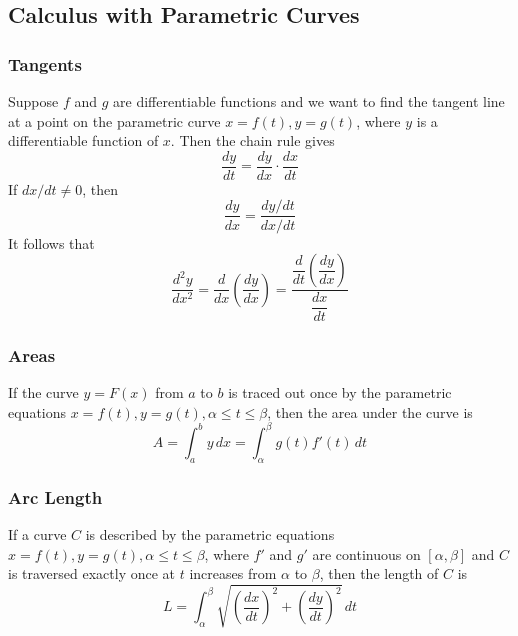 \subsection{Calculus with Parametric Curves}

\subsubsection*{Tangents}
Suppose \(f\) and \(g\) are differentiable functions and we want to find the
tangent line at a point on the parametric curve \(x=f(t),y=g(t)\), where \(y\)
is a differentiable function of \(x\).
Then the chain rule gives
\[\frac{dy}{dt}=\frac{dy}{dx}\cdot\frac{dx}{dt}\]
If \(dx/dt\neq0\), then
\[\frac{dy}{dx}=\frac{dy/dt}{dx/dt}\]
It follows that
\[\frac{d^2y}{dx^2}=\frac{d}{dx}\left(\frac{dy}{dx}\right)
=\frac{\dfrac{d}{dt}\left(\dfrac{dy}{dx}\right)}{\dfrac{dx}{dt}}\]

\subsubsection*{Areas}
If the curve \(y=F(x)\) from \(a\) to \(b\) is traced out once by the
parametric equations \(x=f(t),y=g(t),\alpha\leq t\leq\beta\), then the area
under the curve is
\[A=\int_{a}^{b}y\,dx=\int_{\alpha}^{\beta}g(t)f'(t)\,dt\]

\subsubsection*{Arc Length}
\begin{theorem}
    If a curve \(C\) is described by the parametric equations
    \(x=f(t),y=g(t),\alpha\leq t\leq\beta\), where \(f'\) and \(g'\) are
    continuous on \([\alpha,\beta]\) and \(C\) is traversed exactly once at
    \(t\) increases from \(\alpha\) to \(\beta\), then the length of \(C\) is
    \[L=\int_{\alpha}^{\beta}
    \sqrt{\left(\frac{dx}{dt}\right)^2+\left(\frac{dy}{dt}\right)^2}\,dt\]
\end{theorem}